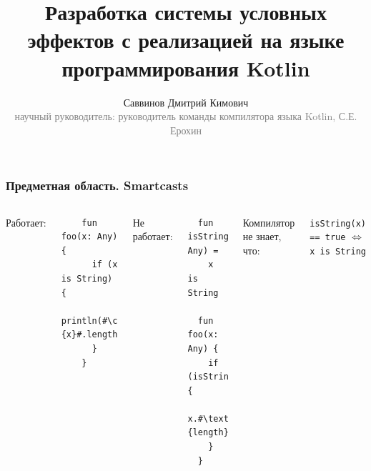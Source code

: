 \documentclass{beamer}
\newcommand{\code}[1]{\texttt{#1}}
\begin{document}
\title[Cистема эффектов для Kotlin]{Разработка системы условных эффектов с реализацией на языке программирования Kotlin}

\author[Саввинов Д.К.]{Саввинов Дмитрий Кимович\\{\footnotesize\textcolor{gray}{научный руководитель: руководитель команды компилятора языка Kotlin, С.Е. Ерохин}}}
\frame{\titlepage}

\begin{frame}[fragile]\frametitle{Предметная область. Smartcasts}
\begin{columns}[T]
  Работает:

  \begin{verbatim}
    fun foo(x: Any) {
      if (x is String) {
        println(#\colorbox{green}{x}#.length)
      }
    }
  \end{verbatim}


  Не работает:

  \begin{verbatim}
  fun isString(x: Any) =
    x is String

  fun foo(x: Any) {
    if (isString(x)) {
     x.#\textcolor{red}{length}#
    }
  }
  \end{verbatim}
  
  Компилятор не знает, что:
  
  \code{isString(x) == true} $\Leftrightarrow$ \code{x is String}
  
\end{columns}
      
  
  
\end{frame}
\end{document}
